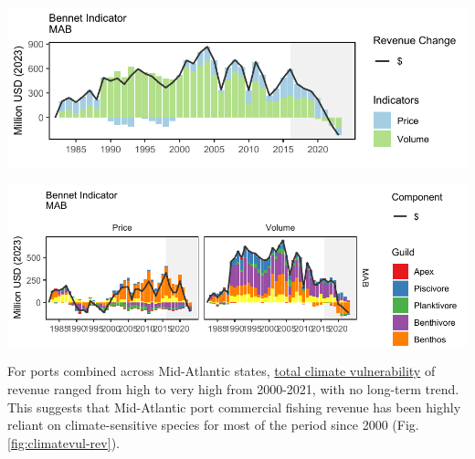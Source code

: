 \documentclass[
  10pt,
]{article}
\let\origfigure\figure
\let\endorigfigure\endfigure
\renewenvironment{figure}[1][2] {
    \expandafter\origfigure\expandafter[H]
} {
    \endorigfigure
}
\begin{document}
\begin{figure}

{\centering \includegraphics{midatlantic_files/figure-latex/bennet-1} 

}

\caption{Revenue change from 1982 values in 2023 dollars (black); Price (PI), and Volume Indicators (VI) for total commercial landings in the Mid-Atlantic Bight.}\label{fig:bennet}
\end{figure}

\begin{figure}

{\centering \includegraphics{midatlantic_files/figure-latex/bennet-all-1} 

}

\caption{Total price and volume indicators in 2023 dollars (black) for commercial landings, and individual guild contributions to each indicator, in the Mid-Atlantic Bight.}\label{fig:bennet-all}
\end{figure}

For ports combined across Mid-Atlantic states, \href{https://noaa-edab.github.io/catalog/community_climate_vulnerability.html}{total climate vulnerability} of revenue ranged from high to very high from 2000-2021, with no long-term trend. This suggests that Mid-Atlantic port commercial fishing revenue has been highly reliant on climate-sensitive species for most of the period since 2000 (Fig. \ref{fig:climatevul-rev}).
\end{document}

